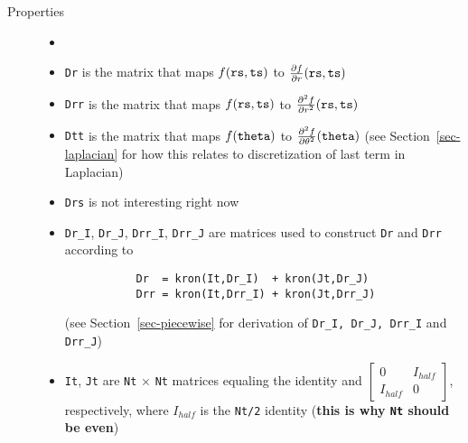 \begin{description}
 \item[Properties]
   \begin{itemize}
    \item[] %
    \item {\tt Dr} is the matrix that maps $f({\tt rs,ts})$ to
          $\frac{\partial f}{\partial r}({\tt rs,ts})$
    \item {\tt Drr} is the matrix that maps $f({\tt rs,ts})$ to
          $\frac{\partial^2 f}{\partial r^2}({\tt rs,ts})$
    \item {\tt Dtt} is the matrix that maps $f({\tt theta})$ to
          $\frac{\partial^2 f}{\partial\theta^2}({\tt theta})$
          (see Section~\ref{sec-laplacian} for how this relates to discretization
          of last term in Laplacian)
    \item {\tt Drs} is not interesting right now
    \item {\tt Dr\_I}, {\tt Dr\_J}, {\tt Drr\_I}, {\tt Drr\_J}
          are matrices used to construct {\tt Dr} and {\tt Drr}
          according to 
          \begin{verbatim}
           Dr  = kron(It,Dr_I)  + kron(Jt,Dr_J)
           Drr = kron(It,Drr_I) + kron(Jt,Drr_J)
          \end{verbatim}
          (see Section~\ref{sec-piecewise} for derivation of
          {\tt Dr\_I, Dr\_J, Drr\_I} and {\tt Drr\_J})
    \item {\tt It}, {\tt Jt} are {\tt Nt} $\times$ {\tt Nt}
          matrices equaling the identity and 
          $\begin{bmatrix} 0 & I_{half} \\ I_{half} & 0\end{bmatrix}$,
          respectively, where $I_{half}$ is the {\tt Nt/2} identity
          ({\bf this is why {\tt Nt} should be even})
   \end{itemize}


\end{description}
